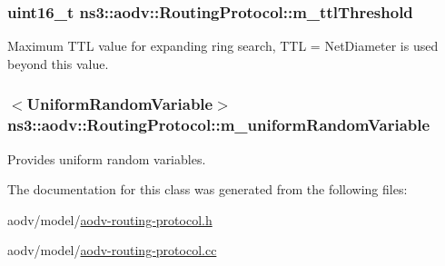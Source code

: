 \subsubsection[{\texorpdfstring{m\+\_\+ttl\+Threshold}{m_ttlThreshold}}]{\setlength{\rightskip}{0pt plus 5cm}uint16\+\_\+t ns3\+::aodv\+::\+Routing\+Protocol\+::m\+\_\+ttl\+Threshold\hspace{0.3cm}{\ttfamily [private]}}\hypertarget{classns3_1_1aodv_1_1RoutingProtocol_a5fa99f38d3f75c20e1a89f4f2e60c42f}{}\label{classns3_1_1aodv_1_1RoutingProtocol_a5fa99f38d3f75c20e1a89f4f2e60c42f}


Maximum T\+TL value for expanding ring search, T\+TL = Net\+Diameter is used beyond this value. 

\subsubsection[{\texorpdfstring{m\+\_\+uniform\+Random\+Variable}{m_uniformRandomVariable}}]{$<${\bf Uniform\+Random\+Variable}$>$ ns3\+::aodv\+::\+Routing\+Protocol\+::m\+\_\+uniform\+Random\+Variable\hspace{0.3cm}{\ttfamily [private]}}\hypertarget{classns3_1_1aodv_1_1RoutingProtocol_a62dd29f4ef02720f5c1c00214dfdd7f9}{}\label{classns3_1_1aodv_1_1RoutingProtocol_a62dd29f4ef02720f5c1c00214dfdd7f9}


Provides uniform random variables. 



The documentation for this class was generated from the following files\+:\begin{DoxyCompactItemize}
\item 
aodv/model/\hyperlink{aodv-routing-protocol_8h}{aodv-\/routing-\/protocol.\+h}\item 
aodv/model/\hyperlink{aodv-routing-protocol_8cc}{aodv-\/routing-\/protocol.\+cc}\end{DoxyCompactItemize}
